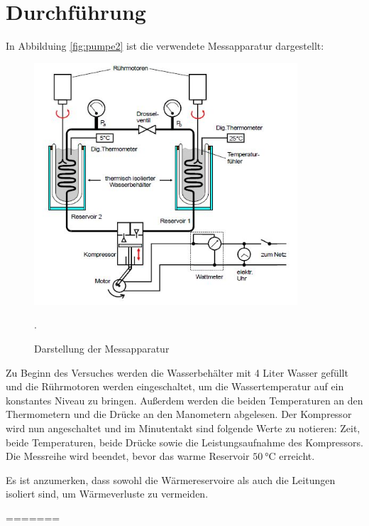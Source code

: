 \section{Durchführung}
In Abbilduing \ref{fig:pumpe2} ist die verwendete Messapparatur dargestellt:
\begin{figure}[H]
  \centering
  \includegraphics[height=9cm]{pumpe2.JPG}
  \caption{Darstellung der Messapparatur}
  \cite{skript}.
  \label{pumpe2}
\end{figure}

Zu Beginn des Versuches werden die Wasserbehälter mit 4 Liter Wasser gefüllt und
die Rührmotoren werden eingeschaltet, um die Wassertemperatur auf ein konstantes
Niveau zu bringen. Außerdem werden die beiden Temperaturen an den Thermometern und die Drücke an den Manometern abgelesen.
Der Kompressor wird nun angeschaltet und im Minutentakt sind folgende Werte zu notieren:
Zeit, beide Temperaturen, beide Drücke sowie die Leistungsaufnahme des Kompressors.
Die Messreihe wird beendet, bevor das warme Reservoir $\SI{50}{\celsius}$ erreicht.

Es ist anzumerken, dass sowohl die Wärmereservoire als auch die Leitungen isoliert sind,
um Wärmeverluste zu vermeiden.


\label{sec:Durchführung}
=======
